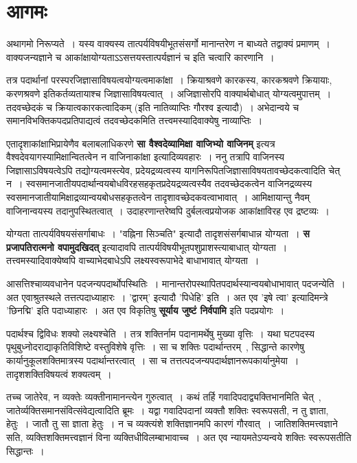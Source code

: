 \section{आगमः}\par
	अथागमो निरूप्यते~। यस्य वाक्यस्य तात्पर्यविषयीभूतसंसर्गो मानान्तरेण न बाध्यते तद्वाक्यं प्रमाणम्~। वाक्यजन्यज्ञाने च आकांक्षायोग्यताऽऽसत्तयस्तात्पर्यज्ञानं च इति चत्वारि कारणानि~।\par
	तत्र पदार्थानां परस्परजिज्ञासाविषयत्वयोग्यत्वमाकांक्षा~। क्रियाश्रवणे कारकस्य, कारकश्रवणे क्रियायाः, करणश्रवणे इतिकर्तव्यतायाश्च जिज्ञासाविषयत्वात्~। अजिज्ञासोरपि वाक्यार्थबोधात् योग्यत्वमुपात्तम्~। तदवच्छेदकं च क्रियात्वकारकत्वादिकम् (इति नातिव्याप्तिः गौरश्व इत्यादौ)~। अभेदान्वये च समानविभक्तिकपदप्रतिपाद्यत्वं तदवच्छेदकमिति तत्त्वमस्यादिवाक्येषु नाव्याप्तिः~।\par
	एतादृशाकांक्षाभिप्रायेणैव बलाबलाधिकरणे {\bfseries सा वैश्वदेव्यामिक्षा वाजिभ्यो वाजिनम्} इत्यत्र वैश्वदेवयागस्यामिक्षान्वितत्वेन न वाजिनाकांक्षा इत्यादिव्यवहारः~। ननु तत्रापि वाजिनस्य जिज्ञासाऽविषयत्वेऽपि तद्योग्यत्वमस्त्येव, प्रदेयद्रव्यत्वस्य यागनिरूपितजिज्ञासाविषयतावच्छेदकत्वादिति चेत् न~। स्वसमानजातीयपदार्थान्वयबोधविरहसहकृतप्रदेयद्रव्यत्वस्यैव तदवच्छेदकत्वेन वाजिनद्रव्यस्य स्वसमानजातीयामिक्षाद्रव्यान्वयबोधसहकृतत्वेन तादृशावच्छेदकवत्वाभावात्~। आमिक्षायान्तु नैवम् वाजिनान्वयस्य तदानुपस्थितत्वात्~। उदाहरणान्तरेष्वपि दुर्बलत्वप्रयोजक आकांक्षाविरह एव द्रष्टव्यः~।\par
	योग्यता तात्पर्यविषयसंसर्गाबाधः~। "वह्निना सिञ्चति" इत्यादौ तादृशसंसर्गबाधान्न योग्यता~। {\bfseries स प्रजापतिरात्मनो वपामुदखिदत्} इत्यादावपि तात्पर्यविषयीभूतपशुप्राशस्त्याबाधात् योग्यता~। तत्त्वमस्यादिवाक्येष्वपि वाच्याभेदबाधेऽपि लक्ष्यस्वरूपाभेदे बाधाभावात् योग्यता~।\par
	आसत्तिश्चाव्यवधानेन पदजन्यपदार्थोपस्थितिः~। मानान्तरोपस्थापितपदार्थस्यान्वयबोधाभावात् पदजन्येति~। अत एवाश्रुतस्थले तत्तत्पदाध्याहारः~। 'द्वारम्' इत्यादौ 'पिधेहि' इति~। अत एव 'इषे त्वा' इत्यादिमन्त्रे 'छिनद्मि' इति पदाध्याहारः~। अत एव विकृतिषु {\bfseries सूर्याय जुष्टं निर्वपामि} इति पदप्रयोगः~।\par
	पदार्थश्च द्विविधः शक्यो लक्ष्यश्चेति~। तत्र शक्तिर्नाम पदानामर्थेषु मुख्या वृत्तिः~। यथा घटपदस्य पृथुबुध्नोदराद्याकृतिविशिष्टे वस्तुविशेषे वृत्तिः~। सा च शक्तिः पदार्थान्तरम्~, सिद्धान्ते कारणेषु कार्यानुकूलशक्तिमात्रस्य पदार्थान्तरत्वात्~। सा च तत्तत्पदजन्यपदार्थज्ञानरूपकार्यानुमेया~। तादृशशक्तिविषयत्वं शक्यत्वम्~।\par
	तच्च जातेरेव, न व्यक्तेः व्यक्तीनामानन्त्येन गुरुत्वात्~। कथं तर्हि गवादिपदाद्व्यक्तिभानमिति चेत्~, जातेर्व्यक्तिसमानसंवित्संवेद्यत्वादिति ब्रूमः~। यद्वा गवादिपदानां व्यक्तौ शक्तिः स्वरूपसती, न तु ज्ञाता, हेतुः~। जातौ तु सा ज्ञाता हेतुः~। न च व्यक्त्यंशे शक्तिज्ञानमपि कारणं गौरवात्~। जातिशक्तिमत्त्वज्ञाने सति, व्यक्तिशक्तिमत्त्वज्ञानं विना व्यक्तिधीविलम्बाभावाच्च~। अत एव न्यायमतेऽप्यन्वये शक्तिः स्वरूपसतीति सिद्धान्तः~।\par
